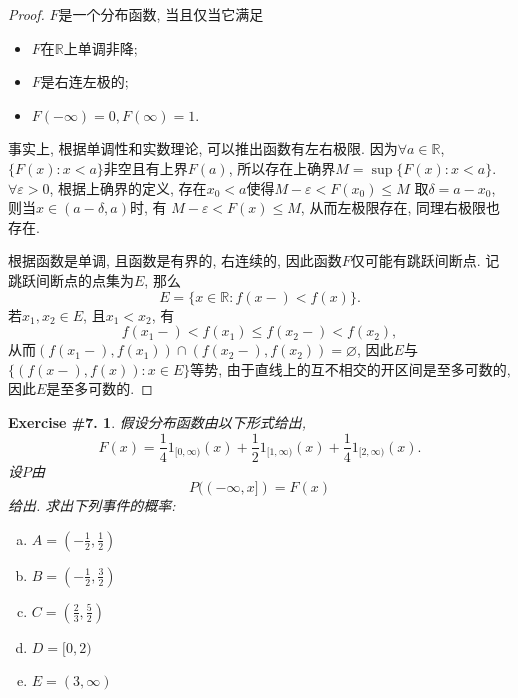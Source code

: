 \documentclass[UTF8, a4paper]{article}
\newtheorem{exercise}{Exercise \#7.}
\begin{document}
\begin{proof}
\(F\)是一个分布函数, 当且仅当它满足
\begin{itemize}
    \item \(F\)在\(\mathbb{R}\)上单调非降;
    \item \(F\)是右连左极的;
    \item \(F(-\infty) = 0, F(\infty) = 1\).
\end{itemize}

事实上, 根据单调性和实数理论, 可以推出函数有左右极限.
因为\(\forall a \in \mathbb{R}\), 
\(\{F(x): x < a\}\)非空且有上界\(F(a)\), 所以存在上确界\(M = \sup\{F(x): x < a\}\).
\(\forall \varepsilon > 0\), 根据上确界的定义, 存在\(x_0 < a\)使得\(M - \varepsilon < F(x_0) \leq M\)
取\(\delta = a - x_0\), 则当\(x \in (a - \delta, a)\)时, 有 \(M - \varepsilon < F(x) \leq M\), 从而左极限存在, 同理右极限也存在.

根据函数是单调, 且函数是有界的, 右连续的, 因此函数\(F\)仅可能有跳跃间断点.
记跳跃间断点的点集为\(E\), 那么
$$
E = \{x\in \mathbb{R}: f(x-) < f(x)\}.
$$
若\(x_1, x_2 \in E\), 且\(x_1 < x_2\), 有
$$
f(x_1 - ) < f(x_1) \leq f(x_2-) < f(x_2),
$$
从而\((f(x_1 - ), f(x_1)) \cap (f(x_2-), f(x_2)) = \varnothing\), 因此\(E\)与
\(\{(f(x-), f(x)): x\in E\}\)等势, 由于直线上的互不相交的开区间是至多可数的, 因此\(E\)是至多可数的.
\end{proof}

\begin{framed}
\begin{exercise}
假设分布函数由以下形式给出, 
$$
F(x)=\frac{1}{4} 1_{[0, \infty)}(x)+\frac{1}{2} 1_{[1, \infty)}(x)+\frac{1}{4} 1_{[2, \infty)}(x) .
$$
设\(P\)由
$$
P((-\infty, x])=F(x)
$$
给出. 求出下列事件的概率:
\begin{enumerate}[a)]
    \item $A=\left(-\frac{1}{2}, \frac{1}{2}\right)$
    \item  $B=\left(-\frac{1}{2}, \frac{3}{2}\right)$
    \item $C=\left(\frac{2}{3}, \frac{5}{2}\right)$
    \item  $D=[0,2)$
    \item $E=(3, \infty)$
\end{enumerate}
\end{exercise}
\end{framed}
\end{document}
